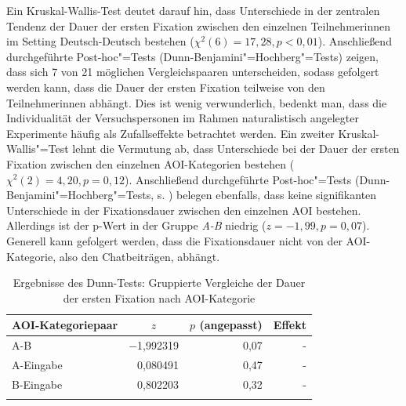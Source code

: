 \begin{sloppypar}
Ein Kruskal-Wallis-Test deutet darauf hin, dass Unterschiede in der zentralen Tendenz der Dauer der ersten Fixation zwischen den einzelnen Teilnehmer{\textperiodcentered}innen im Setting Deutsch-Deutsch bestehen ($\chi^2(6) = 17,28, p < 0,01$). Anschließend durchgeführte Post-hoc"=Tests (Dunn-Benjamini"=Hochberg"=Tests) zeigen, dass sich 7 von 21 möglichen Vergleichspaaren unterscheiden, sodass gefolgert werden kann, dass die Dauer der ersten Fixation teilweise von den Teilnehmer{\textperiodcentered}innen abhängt. Dies ist wenig verwunderlich, bedenkt man, dass die Individualität der Versuchspersonen im Rahmen naturalistisch angelegter Experimente häufig als Zufallseffekte betrachtet werden. Ein zweiter Kruskal-Wallis"=Test lehnt die Vermutung ab, dass Unterschiede bei der Dauer der ersten Fixation zwischen den einzelnen AOI-Kategorien bestehen ($\chi^2(2) = 4,20, p = 0,12$). Anschließend durchgeführte Post-hoc"=Tests (Dunn-Benjamini"=Hochberg"=Tests, s. ) belegen ebenfalls, dass keine signifikanten Unterschiede in der Fixationsdauer zwischen den einzelnen AOI bestehen. Allerdings ist der p-Wert in der Gruppe \emph{A-B} niedrig ($z = -1,99, p = 0,07$). Generell kann gefolgert werden, dass die Fixationsdauer nicht von der AOI-Kategorie, also den Chatbeiträgen, abhängt.\end{sloppypar}




\vfill\begin{table}[H]
    \begin{tabular}{lrrr}  
    \lsptoprule
        {AOI-Kategoriepaar} & \multicolumn{1}{c}{$z$} & \multicolumn{1}{c}{$p$ (angepasst)} & \multicolumn{1}{c}{Effekt}\\ 
        \midrule
        A-B       & −1,992319 & 0,07 & - \\ 
        A-Eingabe & 0,080491 & 0,47 & - \\ 
        B-Eingabe & 0,802203 & 0,32 & -\\ 
        \lspbottomrule
        
    \end{tabular}
            \caption{Ergebnisse des Dunn-Tests: Gruppierte Vergleiche der Dauer der ersten Fixation nach AOI-Kategorie}
    \label{K6:tab:DeDe:dunntest-ffdur}
\end{table}


